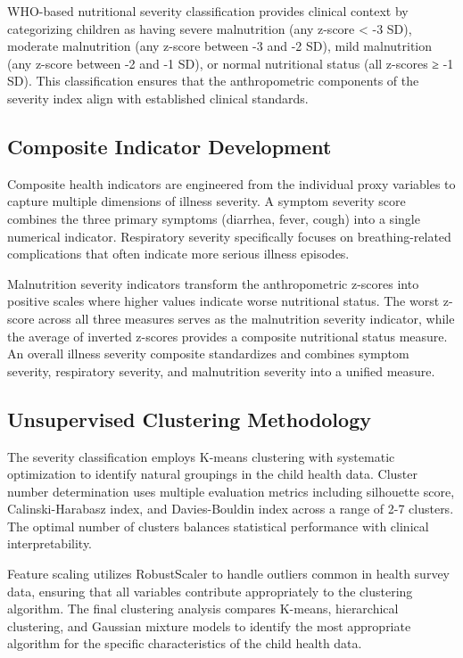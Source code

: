 \documentclass[12pt]{report}
\begin{document}
WHO-based nutritional severity classification provides clinical context by categorizing children as having severe malnutrition (any z-score < -3 SD), moderate malnutrition (any z-score between -3 and -2 SD), mild malnutrition (any z-score between -2 and -1 SD), or normal nutritional status (all z-scores ≥ -1 SD). This classification ensures that the anthropometric components of the severity index align with established clinical standards.

\subsection{Composite Indicator Development}

Composite health indicators are engineered from the individual proxy variables to capture multiple dimensions of illness severity. A symptom severity score combines the three primary symptoms (diarrhea, fever, cough) into a single numerical indicator. Respiratory severity specifically focuses on breathing-related complications that often indicate more serious illness episodes.

Malnutrition severity indicators transform the anthropometric z-scores into positive scales where higher values indicate worse nutritional status. The worst z-score across all three measures serves as the malnutrition severity indicator, while the average of inverted z-scores provides a composite nutritional status measure. An overall illness severity composite standardizes and combines symptom severity, respiratory severity, and malnutrition severity into a unified measure.

\subsection{Unsupervised Clustering Methodology}

The severity classification employs K-means clustering with systematic optimization to identify natural groupings in the child health data. Cluster number determination uses multiple evaluation metrics including silhouette score, Calinski-Harabasz index, and Davies-Bouldin index across a range of 2-7 clusters. The optimal number of clusters balances statistical performance with clinical interpretability.

Feature scaling utilizes RobustScaler to handle outliers common in health survey data, ensuring that all variables contribute appropriately to the clustering algorithm. The final clustering analysis compares K-means, hierarchical clustering, and Gaussian mixture models to identify the most appropriate algorithm for the specific characteristics of the child health data.
\end{document}
